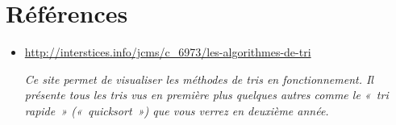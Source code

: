 \section{Références}

	\begin{itemize}
		\item {
			\url{http://interstices.info/jcms/c_6973/les-algorithmes-de-tri}

			\textit{Ce site \cite{trivisuels} permet de visualiser les méthodes
			de tris en fonctionnement. Il présente tous les tris vus en première
			plus quelques autres comme le «~tri rapide~» («~quicksort~») que vous
			verrez en deuxième année.}}

	\end{itemize}
